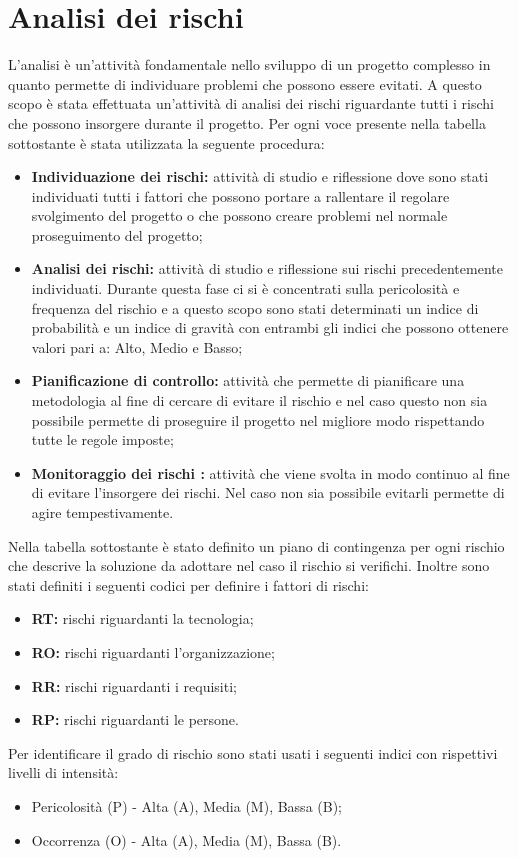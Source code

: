 \section{Analisi dei rischi}
L'analisi è un'attività fondamentale nello sviluppo di un progetto complesso in quanto permette di individuare problemi che possono essere evitati.
A questo scopo è stata effettuata un'attività di analisi dei rischi riguardante tutti i rischi che possono insorgere durante il progetto.
Per ogni voce presente nella tabella sottostante è stata utilizzata la seguente procedura:
\begin{itemize}
	\item \textbf{Individuazione dei rischi:} attività di studio e riflessione dove sono stati individuati tutti i fattori che possono portare a rallentare il regolare svolgimento del progetto o che possono creare problemi nel normale proseguimento del progetto; \\
	\item \textbf{Analisi dei rischi:} attività di studio e riflessione sui rischi precedentemente individuati. Durante questa fase ci si è concentrati sulla pericolosità e frequenza del rischio e a questo scopo sono stati determinati un indice di probabilità e un indice di gravità con entrambi gli indici che possono ottenere valori pari a: Alto, Medio e Basso; \\
	\item \textbf{Pianificazione di controllo:} attività che permette di pianificare una metodologia al fine di cercare di evitare il rischio e nel caso questo non sia possibile permette di proseguire il progetto nel migliore modo rispettando tutte le regole imposte; \\
	\item \textbf{Monitoraggio dei rischi :} attività che viene svolta in modo continuo al fine di evitare l'insorgere dei rischi. Nel caso non sia possibile evitarli permette di agire tempestivamente. \\
\end{itemize}
Nella tabella sottostante è stato definito un piano di contingenza per ogni rischio che descrive la soluzione da adottare nel caso il rischio si verifichi.
Inoltre sono stati definiti i seguenti codici per definire i fattori di rischi:
\begin{itemize}
	\item \textbf{RT:} rischi riguardanti la tecnologia;
	\item \textbf{RO:} rischi riguardanti l'organizzazione;
	\item \textbf{RR:} rischi riguardanti i requisiti;
	\item \textbf{RP:} rischi riguardanti le persone.
\end{itemize}
Per identificare il grado di rischio sono stati usati i seguenti indici con rispettivi livelli di intensità:
\begin{itemize}
	\item Pericolosità (P) - Alta (A), Media (M), Bassa (B);
	\item Occorrenza (O) - Alta (A), Media (M), Bassa (B).
\end{itemize}

